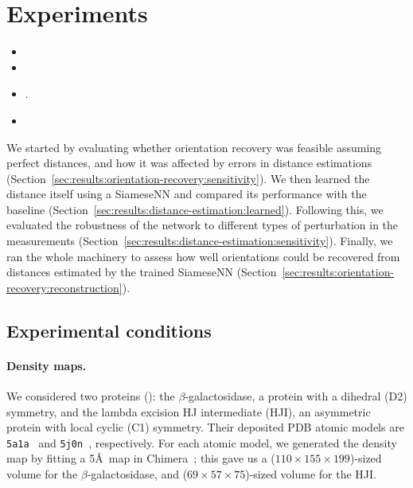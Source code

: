 \section{Experiments}\label{sec:experiments}

\begin{itemize}
    \item {}
    \item {}
    \item {}.
    \item {}
\end{itemize}

We started by evaluating whether orientation recovery was feasible assuming perfect distances, and how it was affected by errors in distance estimations (Section~\ref{sec:results:orientation-recovery:sensitivity}).
We then learned the distance itself using a SiameseNN and compared its performance with the baseline (Section~\ref{sec:results:distance-estimation:learned}).
Following this, we evaluated the robustness of the network to different types of perturbation in the measurements (Section~\ref{sec:results:distance-estimation:sensitivity}).
Finally, we ran the whole machinery to assess how well orientations could be recovered from distances estimated by the trained SiameseNN (Section~\ref{sec:results:orientation-recovery:reconstruction}).


\subsection{Experimental conditions}\label{sec:results:data}

\paragraph{Density maps.}
We considered two proteins (): the $\beta$-galactosidase, a protein with a dihedral (D2) symmetry, and the lambda excision HJ intermediate (HJI), an asymmetric protein with local cyclic (C1) symmetry.
Their deposited PDB atomic models are \texttt{5a1a}~\cite{bartesaghi2015betagal} and \texttt{5j0n}~\cite{laxmikanthan2016structure}, respectively.
For each atomic model, we generated the density map by fitting a 5\AA\ map in Chimera~\cite{pettersen2004ucsf}; this gave us a ($110 \times 155 \times 199$)-sized volume for the $\beta$-galactosidase, and ($69 \times 57 \times 75$)-sized volume for the HJI.

